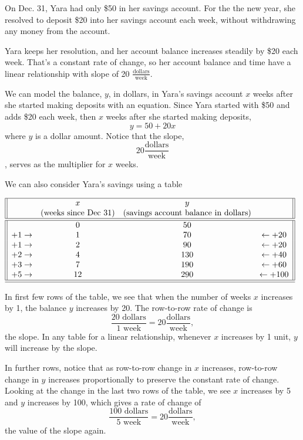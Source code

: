 \documentclass[nooutcomes]{ximera}
\begin{document}
\begin{example}
On Dec. 31, Yara had only \$50 in her savings account. For the the new year, she resolved to deposit \$20 into her savings account each week, without withdrawing any money from the account. 

Yara keeps her resolution, and her account balance increases steadily by \$20 each week. That's a constant rate of change, so her account balance and time have a linear relationship with slope of 20 $\frac{\text{dollars}}{\text{week}}$.  

\begin{explanation}

We can model the balance, $y$,  in dollars, in Yara's savings account $x$  weeks after she started making deposits with an equation. Since Yara started with \$50  and adds \$20  each week, then $x$  weeks after she started making deposits, $$y=50+20x$$ where $y$  is a dollar amount. Notice that the slope, $$20 \frac{\text{dollars}}{\text{week}}$$,  serves as the multiplier for $x$ weeks.

We can also consider Yara's savings using a table

\begin{center}
$
\begin{array}{||cccc||}
\hline
&x &y&\\
&\text{(weeks since Dec 31)}&\text{(savings account balance in dollars)}&\\
\hline 
\hline
&0&50&\\
+1\rightarrow&1&70&\leftarrow +20\\
+1\rightarrow&2&90&\leftarrow +20\\
+2\rightarrow&4&130&\leftarrow +40\\
+3\rightarrow&7&190&\leftarrow +60\\
+5\rightarrow&12&290&\leftarrow +100\\
\hline 
\hline
\end{array}
$
\end{center}



In first few rows of the table, we see that when the number of weeks $x$ increases by 1, the balance $y$  increases by 20.   The row-to-row rate of change is $$\frac{\text{20 dollars}}{\text{1 week}} = 20 \frac{\text{dollars}}{\text{week}},$$   the slope. In any table for a linear relationship, whenever $x$  increases by 1  unit, $y$  will increase by the slope.

In further rows, notice that as row-to-row change in $x$ increases, row-to-row change in $y$  increases proportionally to preserve the constant rate of change. Looking at the change in the last two rows of the table, we see $x$  increases by 5  and $y$  increases by 100,  which gives a rate of change of  $$\frac{\text{100 dollars}}{\text{5 week}} = 20 \frac{\text{dollars}}{\text{week}},$$  the value of the slope again.


\end{explanation}
\end{example}
\end{document}
